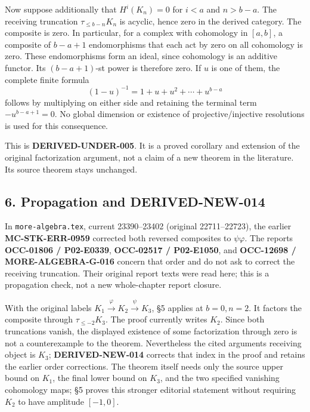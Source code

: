 Now suppose additionally that \(H^i(K_n)=0\) for \(i<a\) and \(n>b-a\). The receiving truncation \(\tau_{\leq b-n}K_n\) is acyclic,\allowbreak{} hence zero in the derived category. The composite is zero. In particular,\allowbreak{} for a complex with cohomology in \([a,b]\),\allowbreak{} a composite of \(b-a+1\) endomorphisms that each act by zero on all cohomology is zero. These endomorphisms form an ideal,\allowbreak{} since cohomology is an additive functor. Its \((b-a+1)\)-st power is therefore zero. If \(u\) is one of them,\allowbreak{} the complete finite formula \[
(1-u)^{-1}=1+u+u^2+\cdots+u^{b-a}
\] follows by multiplying on either side and retaining the terminal term \(-u^{b-a+1}=0\). No global dimension or existence of projective/\allowbreak{}injective resolutions is used for this consequence.

This is \textbf{DERIVED-UNDER-005}. It is a proved corollary and extension of the original factorization argument,\allowbreak{} not a claim of a new theorem in the literature. Its source theorem stays unchanged.

\subsection{6. Propagation and DERIVED-NEW-014}\label{proofs-3487-4161-propagation-and-derived-new-014}

In \texttt{more-\allowbreak{}algebra.\allowbreak{}tex},\allowbreak{} current 23390–\allowbreak{}23402 (original 22711–\allowbreak{}22723)\allowbreak{},\allowbreak{} the earlier \textbf{MC-STK-ERR-0959} corrected both reversed composites to \(\psi\varphi\). The reports \textbf{OCC-01806 /\allowbreak{} P02-E0339},\allowbreak{} \textbf{OCC-02517 /\allowbreak{} P02-E1050},\allowbreak{} and \textbf{OCC-12698 /\allowbreak{} MORE-ALGEBRA-G-016} concern that order and do not ask to correct the receiving truncation. Their original report texts were read here; this is a propagation check,\allowbreak{} not a new whole-chapter report closure.

With the original labels \(K_1\xrightarrow\varphi K_2
\xrightarrow\psi K_3\),\allowbreak{} §5 applies at \(b=0,n=2\). It factors the composite through \textbf{\(\tau_{\leq-2}K_3\)}. The proof currently writes \(K_2\). Since both truncations vanish,\allowbreak{} the displayed existence of some factorization through zero is not a counterexample to the theorem. Nevertheless the cited argument\textquotesingle s receiving object is \(K_3\); \textbf{DERIVED-NEW-014} corrects that index in the proof and retains the earlier order corrections. The theorem itself needs only the source upper bound on \(K_1\),\allowbreak{} the final lower bound on \(K_3\),\allowbreak{} and the two specified vanishing cohomology maps; §5 proves this stronger editorial statement without requiring \(K_2\) to have amplitude \([-1,0]\).

